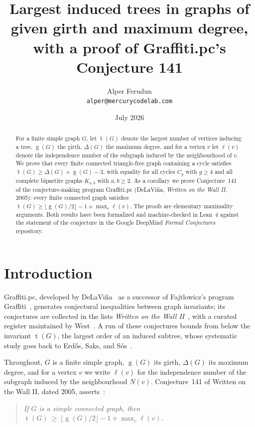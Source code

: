 \documentclass[11pt]{article}
\title{Largest induced trees in graphs of given girth and maximum degree,\\
with a proof of Graffiti.pc's Conjecture 141}
\author{Alper Ferudun\\\texttt{alper@mercurycodelab.com}}
\date{July 2026}
\numberwithin{equation}{section}
\theoremstyle{remark}
\newcommand{\tr}{\operatorname{t}}
\newcommand{\gr}{\operatorname{g}}
\newcommand{\lv}{\ell}
\begin{document}
\maketitle

\begin{abstract}
For a finite simple graph $G$, let $\tr(G)$ denote the largest number of
vertices inducing a tree, $\gr(G)$ the girth, $\Delta(G)$ the maximum degree,
and for a vertex $v$ let $\lv(v)$ denote the independence number of the
subgraph induced by the neighbourhood of $v$.  We prove that every finite
connected triangle-free graph containing a cycle satisfies
$\tr(G)\ge\Delta(G)+\gr(G)-3$, with equality for all cycles $C_g$ with
$g\ge4$ and all complete bipartite graphs $K_{a,b}$ with $a,b\ge2$.  As a corollary we prove Conjecture~141 of the
conjecture-making program Graffiti.pc (DeLaVi\~na, \emph{Written on the Wall
II}, 2005): every finite connected graph satisfies
$\tr(G)\ge\lfloor\gr(G)/2\rfloor-1+\max_v\lv(v)$.  The proofs are elementary
maximality arguments.  Both results have been formalized and machine-checked
in Lean~4 against the statement of the conjecture in the Google DeepMind
\emph{Formal Conjectures} repository.
\end{abstract}

\section{Introduction}

Graffiti.pc, developed by DeLaVi\~na~\cite{DeL01,DeLhistory} as a successor of
Fajtlowicz's program Graffiti~\cite{Faj88}, generates conjectural inequalities
between graph invariants; its conjectures are collected in the lists
\emph{Written on the Wall II}~\cite{WOWII}, with a curated register maintained
by West~\cite{WestReg}.  A run of these conjectures bounds from below the
invariant $\tr(G)$, the largest order of an induced subtree, whose systematic
study goes back to Erd\H{o}s, Saks, and S\'os~\cite{ESS86}.

Throughout, $G$ is a finite simple graph, $\gr(G)$ its girth, $\Delta(G)$ its
maximum degree, and for a vertex $v$ we write
$\lv(v)$ for the independence number of the subgraph induced by the
neighbourhood $N(v)$.  Conjecture~141 of Written on the Wall II, dated 2005,
asserts~\cite{WOWII}:

\begin{quote}
\emph{If $G$ is a simple connected graph, then
$\tr(G)\ \ge\ \lfloor \gr(G)/2\rfloor - 1 + \max_v \lv(v)$.}
\end{quote}
\end{document}
